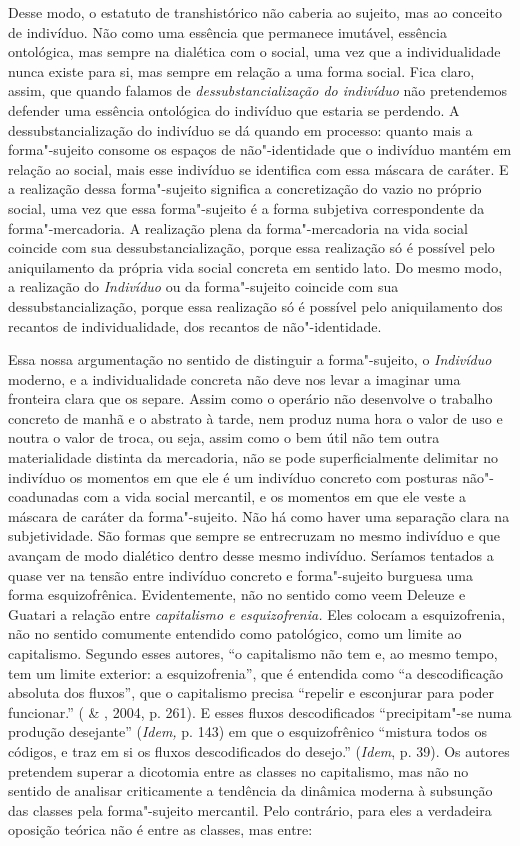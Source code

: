 Desse modo, o estatuto de transhistórico não caberia ao sujeito, mas ao
conceito de indivíduo. Não como uma essência que permanece imutável,
essência ontológica, mas sempre na dialética com o social, uma vez que a
individualidade nunca existe para si, mas sempre em relação a uma forma
social. Fica claro, assim, que quando falamos de
\emph{dessubstancialização do indivíduo} não pretendemos defender uma
essência ontológica do indivíduo que estaria se perdendo. A
dessubstancialização do indivíduo se dá quando em processo: quanto mais
a forma"-sujeito consome os espaços de não"-identidade que o indivíduo
mantém em relação ao social, mais esse indivíduo se identifica com essa
máscara de caráter. E a realização dessa forma"-sujeito significa a
concretização do vazio no próprio social, uma vez que essa forma"-sujeito
é a forma subjetiva correspondente da forma"-mercadoria. A realização
plena da forma"-mercadoria na vida social coincide com sua
dessubstancialização, porque essa realização só é possível pelo
aniquilamento da própria vida social concreta em sentido lato. Do mesmo
modo, a realização do \emph{Indivíduo} ou da forma"-sujeito coincide com
sua dessubstancialização, porque essa realização só é possível pelo
aniquilamento dos recantos de individualidade, dos recantos de
não"-identidade.

Essa nossa argumentação no sentido de distinguir a forma"-sujeito, o
\emph{Indivíduo} moderno, e a individualidade concreta não deve nos
levar a imaginar uma fronteira clara que os separe. Assim como o
operário não desenvolve o trabalho concreto de manhã e o abstrato à
tarde, nem produz numa hora o valor de uso e noutra o valor de troca, ou
seja, assim como o bem útil não tem outra materialidade distinta da
mercadoria, não se pode superficialmente delimitar no indivíduo os
momentos em que ele é um indivíduo concreto com posturas não"-coadunadas
com a vida social mercantil, e os momentos em que ele veste a máscara de
caráter da forma"-sujeito. Não há como haver uma separação clara na
subjetividade. São formas que sempre se entrecruzam no mesmo indivíduo e
que avançam de modo dialético dentro desse mesmo indivíduo. Seríamos
tentados a quase ver na tensão entre indivíduo concreto e forma"-sujeito
burguesa uma forma esquizofrênica. Evidentemente, não no sentido como
veem Deleuze e Guatari a relação entre \emph{capitalismo e
esquizofrenia.} Eles colocam a esquizofrenia, não no sentido comumente
entendido como patológico, como um limite ao capitalismo. Segundo esses
autores, ``o capitalismo não tem e, ao mesmo tempo, tem um limite
exterior: a esquizofrenia'', que é entendida como ``a descodificação
absoluta dos fluxos'', que o capitalismo precisa ``repelir e esconjurar
para poder funcionar.'' ( \& , 2004, p. 261). E esses
fluxos descodificados ``precipitam"-se numa produção desejante''
(\emph{Idem,} p. 143) em que o esquizofrênico ``mistura todos os
códigos, e traz em si os fluxos descodificados do desejo.''
(\emph{Idem}, p. 39). Os autores pretendem superar a dicotomia entre as
classes no capitalismo, mas não no sentido de analisar criticamente a
tendência da dinâmica moderna à subsunção das classes pela forma"-sujeito
mercantil. Pelo contrário, para eles a verdadeira oposição teórica não é
entre as classes, mas entre:

